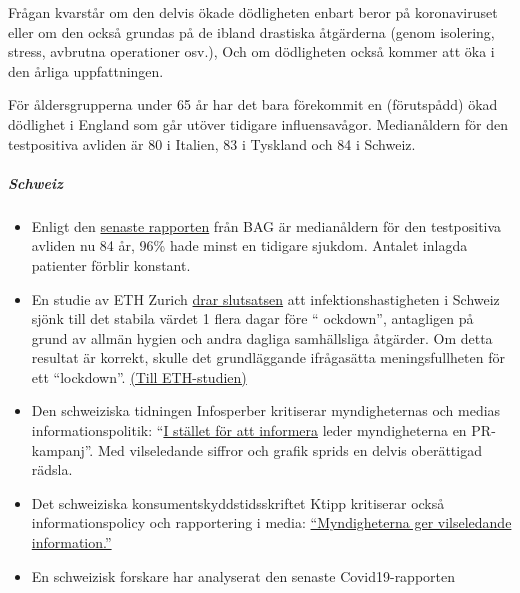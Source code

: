 Frågan kvarstår om den delvis ökade dödligheten enbart beror på
koronaviruset eller om den också grundas på de ibland drastiska
åtgärderna (genom isolering, stress, avbrutna operationer osv.), Och om
dödligheten också kommer att öka i den årliga uppfattningen.

För åldersgrupperna under 65 år har det bara förekommit en (förutspådd)
ökad dödlighet i England som går utöver tidigare influensavågor.
Medianåldern för den testpositiva avliden är 80 i Italien, 83 i Tyskland
och 84 i Schweiz.

\hypertarget{schweiz}{%
\subparagraph{\texorpdfstring{\textbf{Schweiz}}{Schweiz}}\label{schweiz}}

\begin{itemize}
\tightlist
\item
  Enligt den
  \href{https://www.bag.admin.ch/bag/de/home/krankheiten/ausbrueche-epidemien-pandemien/aktuelle-ausbrueche-epidemien/novel-cov/situation-schweiz-und-international.html}{senaste
  rapporten} från BAG är medianåldern för den testpositiva avliden nu 84
  år, 96\% hade minst en tidigare sjukdom. Antalet inlagda patienter
  förblir konstant.
\item
  En studie av ETH Zurich
  \href{https://www.tagesanzeiger.ch/ansteckungsraten-flachten-bereits-vor-dem-lockdown-ab-809893127675}{drar
  slutsatsen} att infektionshastigheten i Schweiz sjönk till det stabila
  värdet 1 flera dagar före `` ockdown'', antagligen på grund av allmän
  hygien och andra dagliga samhällsliga åtgärder. Om detta resultat är
  korrekt, skulle det grundläggande ifrågasätta meningsfullheten för ett
  ``lockdown''.
  \href{https://bsse.ethz.ch/cevo/research/sars-cov-2/real-time-monitoring-in-switzerland.html}{(Till
  ETH-studien)}
\item
  Den schweiziska tidningen Infosperber kritiserar myndigheternas och
  medias informationspolitik:
  ``\href{https://www.infosperber.ch/Artikel/Gesundheit/Corona-Statt-zu-informieren-fuhren-Behorden-eine-PR-Kampagne}{I
  stället för att informera} leder myndigheterna en PR-kampanj''. Med
  vilseledande siffror och grafik sprids en delvis oberättigad rädsla.
\item
  Det schweiziska konsumentskyddstidsskriftet Ktipp kritiserar också
  informationspolicy och rapportering i media:
  \href{https://www.ktipp.ch/artikel/artikeldetail/behoerden-informieren-irrefuehrend/}{``Myndigheterna
  ger vilseledande information.''}
\item
  En schweizisk forskare har analyserat den senaste Covid19-rapporten

\end{itemize}
